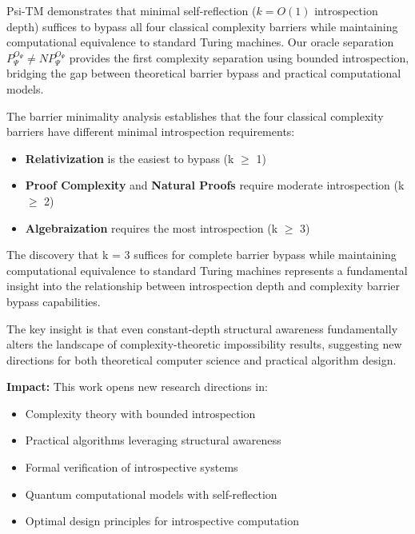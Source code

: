 \documentclass[11pt]{article}
\theoremstyle{definition}
\begin{document}
Psi-TM demonstrates that minimal self-reflection ($k = O(1)$ introspection depth) suffices to bypass all four classical complexity barriers while maintaining computational equivalence to standard Turing machines. Our oracle separation $P^{O_\Psi}_\Psi \neq NP^{O_\Psi}_\Psi$ provides the first complexity separation using bounded introspection, bridging the gap between theoretical barrier bypass and practical computational models.

The barrier minimality analysis establishes that the four classical complexity barriers have different minimal introspection requirements:
\begin{itemize}
\item \textbf{Relativization} is the easiest to bypass (k $\geq$ 1)
\item \textbf{Proof Complexity} and \textbf{Natural Proofs} require moderate introspection (k $\geq$ 2)
\item \textbf{Algebraization} requires the most introspection (k $\geq$ 3)
\end{itemize}

The discovery that k = 3 suffices for complete barrier bypass while maintaining computational equivalence to standard Turing machines represents a fundamental insight into the relationship between introspection depth and complexity barrier bypass capabilities.

The key insight is that even constant-depth structural awareness fundamentally alters the landscape of complexity-theoretic impossibility results, suggesting new directions for both theoretical computer science and practical algorithm design.

\textbf{Impact:} This work opens new research directions in:
\begin{itemize}
\item Complexity theory with bounded introspection
\item Practical algorithms leveraging structural awareness
\item Formal verification of introspective systems
\item Quantum computational models with self-reflection
\item Optimal design principles for introspective computation
\end{itemize}
\end{document}
